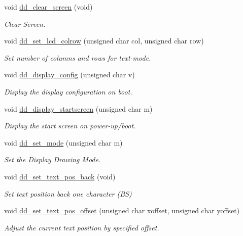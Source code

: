\begin{DoxyCompactItemize}
void \hyperlink{group__display_ga2148fb37938f252395fda6f9d57eebbc}{dd\-\_\-clear\-\_\-screen} (void)
\begin{DoxyCompactList}\small\item\em \-Clear \-Screen. \end{DoxyCompactList}\item 
void \hyperlink{group__display_ga51372d6a4a835af59fb125047480817d}{dd\-\_\-set\-\_\-lcd\-\_\-colrow} (unsigned char col, unsigned char row)
\begin{DoxyCompactList}\small\item\em \-Set number of columns and rows for text-\/mode. \end{DoxyCompactList}\item 
void \hyperlink{group__display_ga0abe17f5102182bf238c73d4a50a8e8a}{dd\-\_\-display\-\_\-config} (unsigned char v)
\begin{DoxyCompactList}\small\item\em \-Display the display configuration on boot. \end{DoxyCompactList}\item 
void \hyperlink{group__display_ga5353e51faeecba308836d1f9f9099783}{dd\-\_\-display\-\_\-startscreen} (unsigned char m)
\begin{DoxyCompactList}\small\item\em \-Display the start screen on power-\/up/boot. \end{DoxyCompactList}\item 
void \hyperlink{group__display_ga76233358da6e394f00dddf557cb8d088}{dd\-\_\-set\-\_\-mode} (unsigned char m)
\begin{DoxyCompactList}\small\item\em \-Set the \-Display \-Drawing \-Mode. \end{DoxyCompactList}\item 
void \hyperlink{group__display_ga599a978209e3d9c4e4d1f129ad21715c}{dd\-\_\-set\-\_\-text\-\_\-pos\-\_\-back} (void)
\begin{DoxyCompactList}\small\item\em \-Set text position back one character (\-B\-S) \end{DoxyCompactList}\item 
void \hyperlink{group__display_gad1a1870cebdd4e0df17d1ff9f990b40c}{dd\-\_\-set\-\_\-text\-\_\-pos\-\_\-offset} (unsigned char xoffset, unsigned char yoffset)
\begin{DoxyCompactList}\small\item\em \-Adjust the current text position by specified offset. \end{DoxyCompactList}\item 

\end{DoxyCompactItemize}
